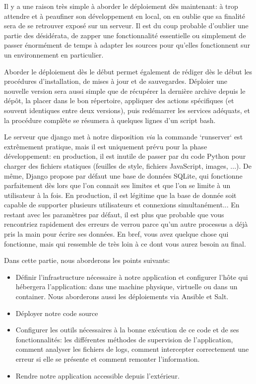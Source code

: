 Il y a une raison très simple à aborder le déploiement dès maintenant: à trop attendre et à peaufiner son développement en local, on en oublie que sa finalité sera de se retrouver exposé sur un serveur.
Il est du coup probable d'oublier une partie des désidérata, de zapper une fonctionnalité essentielle ou simplement de passer énormément de temps à adapter les sources pour qu'elles fonctionnent sur un environnement en particulier.

Aborder le déploiement dès le début permet également de rédiger dès le début les procédures d'installation, de mises à jour et de sauvegardes.
Déploier une nouvelle version sera aussi simple que de récupérer la dernière archive depuis le dépôt, la placer dans le bon répertoire, appliquer des actions spécifiques (et souvent identiques entre deux versions), puis redémarrer les services adéquats, et la procédure complète se résumera à quelques lignes d'un script bash.

Le serveur que django met à notre disposition \textit{via} la commande `runserver` est extrêmement pratique, mais il est uniquement prévu pour la phase  développement: en production, il est inutile de passer par du code Python pour charger des fichiers statiques (feuilles de style, fichiers JavaScript, images, ...).
De même, Django propose par défaut une base de données SQLite, qui fonctionne parfaitement dès lors que l'on connait ses limites et que l'on se limite à un utilisateur à la fois. En production, il est légitime que la base de donnée soit capable de supporter plusieurs utilisateurs et connexions simultanément...
En restant avec les paramètres par défaut, il est plus que probable que vous rencontriez rapidement des erreurs de verrou parce qu'un autre processus a déjà pris la main pour écrire ses données.
En bref, vous avez quelque chose qui fonctionne, mais qui ressemble de très loin à ce dont vous aurez besoin au final.

Dans cette partie, nous aborderons les points suivants:

\begin{itemize}
    \item Définir l'infrastructure nécessaire à notre application et configurer l'hôte qui hébergera l'application: dans une machine physique, virtuelle ou dans un container. Nous aborderons aussi les déploiements via Ansible et Salt.
    \item Déployer notre code source
    \item Configurer les outils nécessaires à la bonne exécution de ce code et de ses fonctionnalités: les différentes méthodes de supervision de l'application, comment analyser les fichiers de logs, comment intercepter correctement une erreur si elle se présente et comment remonter l'information.
    \item Rendre notre application accessible depuis l'extérieur.
\end{itemize}

